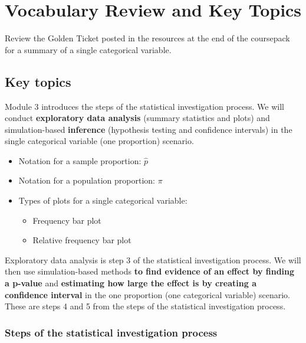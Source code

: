\documentclass[
]{report}
\begin{document}
\section{Vocabulary Review and Key Topics}\label{vocabulary-review-and-key-topics-2}

Review the Golden Ticket posted in the resources at the end of the coursepack for a summary of a single categorical variable.

\subsection{Key topics}\label{key-topics-2}

Module 3 introduces the steps of the statistical investigation process. We will conduct \textbf{exploratory data analysis} (summary statistics and plots) and simulation-based \textbf{inference} (hypothesis testing and confidence intervals) in the single categorical variable (one proportion) scenario.

\begin{itemize}
\item
  Notation for a sample proportion: \(\hat{p}\)
\item
  Notation for a population proportion: \(\pi\)
\item
  Types of plots for a single categorical variable:

  \begin{itemize}
  \item
    Frequency bar plot
  \item
    Relative frequency bar plot
  \end{itemize}
\end{itemize}

Exploratory data analysis is step 3 of the statistical investigation process. We will then use simulation-based methods \textbf{to find evidence of an effect by finding a p-value} and \textbf{estimating how large the effect is by creating a confidence interval} in the one proportion (one categorical variable) scenario. These are steps 4 and 5 from the steps of the statistical investigation process.

\subsubsection*{Steps of the statistical investigation process}\label{steps-of-the-statistical-investigation-process}
\end{document}
